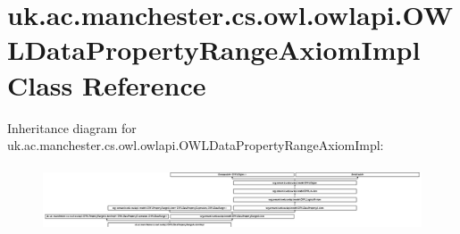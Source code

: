 \hypertarget{classuk_1_1ac_1_1manchester_1_1cs_1_1owl_1_1owlapi_1_1_o_w_l_data_property_range_axiom_impl}{\section{uk.\-ac.\-manchester.\-cs.\-owl.\-owlapi.\-O\-W\-L\-Data\-Property\-Range\-Axiom\-Impl Class Reference}
\label{classuk_1_1ac_1_1manchester_1_1cs_1_1owl_1_1owlapi_1_1_o_w_l_data_property_range_axiom_impl}
}
Inheritance diagram for uk.\-ac.\-manchester.\-cs.\-owl.\-owlapi.\-O\-W\-L\-Data\-Property\-Range\-Axiom\-Impl\-:\begin{figure}[H]
\begin{center}
\leavevmode
\includegraphics[height=1.941555cm]{classuk_1_1ac_1_1manchester_1_1cs_1_1owl_1_1owlapi_1_1_o_w_l_data_property_range_axiom_impl}
\end{center}
\end{figure}
